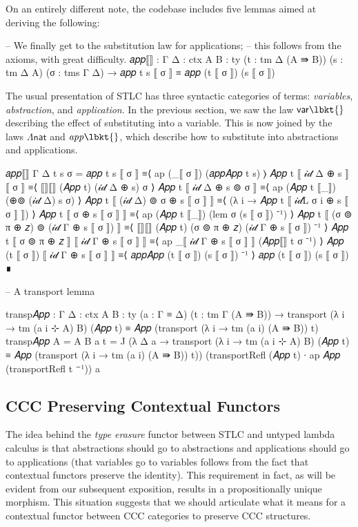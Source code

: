 On an entirely different note, the codebase includes five lemmas aimed at
deriving the following:
\begin{code}
  -- We finally get to the substitution law for applications;
  -- this follows from the axioms, with great difficulty.
  𝑎𝑝𝑝⟦⟧ : {Γ Δ : ctx} {A B : ty} (t : tm Δ (A ⇛ B)) (s : tm Δ A) (σ : tms Γ Δ) →
    𝑎𝑝𝑝 t s ⟦ σ ⟧ ≡ 𝑎𝑝𝑝 (t ⟦ σ ⟧) (s ⟦ σ ⟧)
\end{code}
The usual presentation of STLC has three syntactic categories of terms:
\emph{variables}, \emph{abstraction}, and \emph{application}. In the previous
section, we saw the law $\mathsf{var}\lbkt{}$ describing the effect of
substituting into a variable. This is now joined by the laws
$\Lambda\mathsf{nat}$ and $\mathit{app}\lbkt{}$, which describe how to
substitute into abstractions and applications.
\begin{code}[hide]
  𝑎𝑝𝑝⟦⟧ {Γ} {Δ} t s σ =
    𝑎𝑝𝑝 t s ⟦ σ ⟧
      ≡⟨ ap (_⟦ σ ⟧) (𝑎𝑝𝑝𝐴𝑝𝑝 t s) ⟩
    𝐴𝑝𝑝 t ⟦ 𝒾𝒹 Δ ⊕ s ⟧ ⟦ σ ⟧
      ≡⟨ ⟦⟧⟦⟧ (𝐴𝑝𝑝 t) (𝒾𝒹 Δ  ⊕ s) σ ⟩
    𝐴𝑝𝑝 t ⟦ 𝒾𝒹 Δ ⊕ s ⊚ σ ⟧
      ≡⟨ ap (𝐴𝑝𝑝 t ⟦_⟧) (⊕⊚ (𝒾𝒹 Δ) s σ) ⟩
    𝐴𝑝𝑝 t ⟦ (𝒾𝒹 Δ) ⊚ σ ⊕ s ⟦ σ ⟧ ⟧
      ≡⟨ (λ i → 𝐴𝑝𝑝 t ⟦ 𝒾𝒹L σ i ⊕ s ⟦ σ ⟧ ⟧) ⟩
    𝐴𝑝𝑝 t ⟦ σ ⊕ s ⟦ σ ⟧ ⟧
      ≡⟨ ap (𝐴𝑝𝑝 t ⟦_⟧) (lem σ (s ⟦ σ ⟧) ⁻¹) ⟩
    𝐴𝑝𝑝 t ⟦ (σ ⊚ π ⊕ 𝑧) ⊚ (𝒾𝒹 Γ ⊕ s ⟦ σ ⟧) ⟧
      ≡⟨ ⟦⟧⟦⟧ (𝐴𝑝𝑝 t) (σ ⊚ π ⊕ 𝑧) (𝒾𝒹 Γ ⊕ s ⟦ σ ⟧) ⁻¹ ⟩
    𝐴𝑝𝑝 t ⟦ σ ⊚ π ⊕ 𝑧 ⟧ ⟦ 𝒾𝒹 Γ ⊕ s ⟦ σ ⟧ ⟧
      ≡⟨ ap _⟦ 𝒾𝒹 Γ ⊕ s ⟦ σ ⟧ ⟧ (𝐴𝑝𝑝⟦⟧ t σ ⁻¹) ⟩
    𝐴𝑝𝑝 (t ⟦ σ ⟧) ⟦ 𝒾𝒹 Γ ⊕ s ⟦ σ ⟧ ⟧
      ≡⟨ 𝑎𝑝𝑝𝐴𝑝𝑝 (t ⟦ σ ⟧) (s ⟦ σ ⟧) ⁻¹ ⟩
    𝑎𝑝𝑝 (t ⟦ σ ⟧) (s ⟦ σ ⟧)
      ∎

  -- A transport lemma

  transp𝐴𝑝𝑝 : {Γ Δ : ctx} {A B : ty} (a : Γ ≡ Δ) (t : tm Γ (A ⇛ B)) →
    transport (λ i → tm (a i ⊹ A) B) (𝐴𝑝𝑝 t) ≡ 𝐴𝑝𝑝 (transport (λ i → tm (a i) (A ⇛ B)) t)
  transp𝐴𝑝𝑝 {A = A} {B} a t =
    J (λ Δ a → transport (λ i → tm (a i ⊹ A) B) (𝐴𝑝𝑝 t)
      ≡ 𝐴𝑝𝑝 (transport (λ i → tm (a i) (A ⇛ B)) t))
      (transportRefl (𝐴𝑝𝑝 t) ∙ ap 𝐴𝑝𝑝 (transportRefl t ⁻¹)) a
\end{code}

\subsection{CCC Preserving Contextual Functors}

The idea behind the \emph{type erasure} functor between STLC and untyped lambda
calculus is that abstractions should go to abstractions and applications should
go to applications (that variables go to variables follows from the fact that
contextual functors preserve the identity). This requirement in fact, as will be
evident from our subsequent exposition, results in a propositionally unique
morphism. This situation suggests that we should articulate what it means for a
contextual functor between CCC categories to preserve CCC structures.

